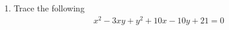 \begin{enumerate}[label=\thesubsection.\arabic*.,ref=\thesubsection.\theenumi]
\solution

\item Trace the following 
\begin{align}
    x^2-3xy+y^2+10x-10y+21=0 \label{eq:solutions/41/ex2/eq 1}
\end{align}
%
\solution


\end{enumerate}
